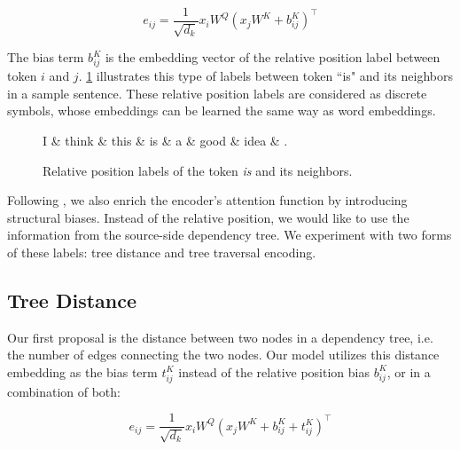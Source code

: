 \begin{equation}
    e_{ij}=\frac{1}{\sqrt{d_k}} x_i W^Q (x_j W^K + b^K_{ij})^\top
\end{equation}

The bias term $b^K_{ij}$ is the embedding vector of the relative position label between token $i$ and $j$. \cref{fig:relative-position-label} illustrates this type of labels between token ``is" and its neighbors in a sample sentence.
These relative position labels are considered as discrete symbols, whose embeddings can be learned the same way as word embeddings.

\begin{figure}[t]
    \centering
    \begin{dependency}
        \begin{deptext}
        I \& think \& this \& is \& a \& good \& idea \& . \\
        \end{deptext}
    \end{dependency}
    \caption{Relative position labels of the token \textit{is} and its neighbors.}
    \label{fig:relative-position-label}
\end{figure}

Following \citeauthor{DBLP:conf/naacl/ShawUV18}, we also enrich the encoder's attention function by introducing structural biases.
Instead of the relative position, we would like to use the information from the source-side dependency tree.
We experiment with two forms of these labels: tree distance and tree traversal encoding.

\subsection{Tree Distance}
\label{enriching-structure-treedist}

Our first proposal is the distance between two nodes in a dependency tree, i.e. the number of edges connecting the two nodes. Our model \TreeDistance utilizes this distance embedding as the bias term $t_{ij}^K$ instead of the relative position bias $b^K_{ij}$, or in a combination of both:

\begin{equation}
 e_{ij}=\frac{1}{\sqrt{d_k}} x_i W^Q (x_j W^K + b^K_{ij} + t_{ij}^K)^\top
\end{equation}

